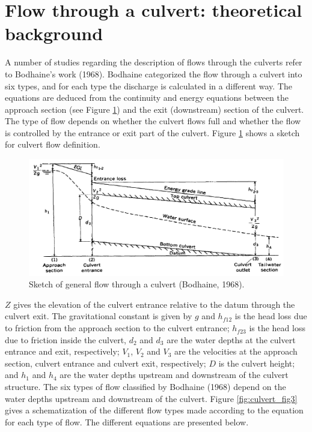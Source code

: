 \section{Flow through a culvert: theoretical background}

A number of studies regarding the description of flows through the culverts
refer to Bodhaine's work (1968).
Bodhaine categorized the flow through a culvert into six types, and for each type
the discharge is calculated in a different way.
The equations are deduced from the continuity and energy equations between the approach
section (see Figure \ref{fig:culvert_fig2}) and the exit (downstream) section of the culvert.
The type of flow depends on whether the culvert flows full and whether the flow is controlled
by the entrance or exit part of the culvert. Figure \ref{fig:culvert_fig2}
shows a sketch for culvert flow definition.

\begin{figure}[H]
\begin{center}
  \includegraphics[scale=1]{culvert_fig2.png}
\end{center}
\caption{Sketch of general flow through a culvert (Bodhaine, 1968).}
\label{fig:culvert_fig2}
\end{figure}

$Z$ gives the elevation of the culvert entrance relative to the datum through the culvert exit.
The gravitational constant is given by $g$ and $h_{f12}$ is the head loss due to friction from
the approach section to the culvert entrance;
$h_{f23}$ is the head loss due to friction inside the culvert, $d_2$ and $d_3$ are the water
depths at the culvert entrance and exit, respectively;
$V_1$, $V_2$ and $V_3$ are the velocities at the approach section,
culvert entrance and culvert exit, respectively;
$D$ is the culvert height;
and $h_1$ and $h_4$ are the water depths upstream and downstream of the culvert structure.
The six types of flow classified by Bodhaine (1968) depend on the water depths
upstream and downstream of the culvert.
Figure \ref{fig:culvert_fig3} gives a schematization of the different flow types
made according to the equation for each type of flow.
The different equations are presented below.

